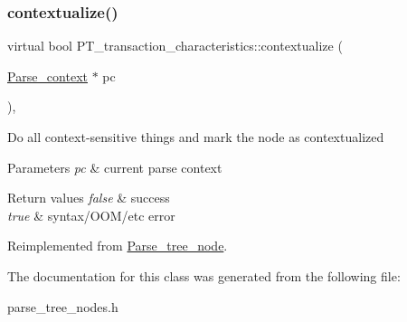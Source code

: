 \subsubsection{\texorpdfstring{contextualize()}{contextualize()}}
{\footnotesize\ttfamily virtual bool P\+T\+\_\+transaction\+\_\+characteristics\+::contextualize (\begin{DoxyParamCaption}\item[{\mbox{\hyperlink{structParse__context}{Parse\+\_\+context}} $\ast$}]{pc }\end{DoxyParamCaption})\hspace{0.3cm}{\ttfamily [inline]}, {\ttfamily [virtual]}}

Do all context-\/sensitive things and mark the node as contextualized


\begin{DoxyParams}{Parameters}
{\em pc} & current parse context\\
\hline
\end{DoxyParams}

\begin{DoxyRetVals}{Return values}
{\em false} & success \\
\hline
{\em true} & syntax/\+O\+O\+M/etc error \\
\hline
\end{DoxyRetVals}


Reimplemented from \mbox{\hyperlink{classParse__tree__node_a22d93524a537d0df652d7efa144f23da}{Parse\+\_\+tree\+\_\+node}}.



The documentation for this class was generated from the following file\+:\begin{DoxyCompactItemize}
\item 
parse\+\_\+tree\+\_\+nodes.\+h\end{DoxyCompactItemize}
